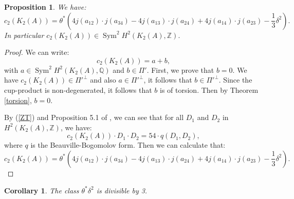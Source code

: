 \documentclass{amsart}
\DeclareMathOperator{\Sym}{Sym}
\newcommand{\Q}{\mathbb{Q}}
\newcommand{\Z}{\mathbb{Z}}
\theoremstyle{plain}
\newtheorem{proposition}[theorem]{Proposition}
\newtheorem{corollary}[theorem]{Corollary}
\theoremstyle{definition}
\theoremstyle{remark}
\begin{document}
\begin{proposition}
We have:
$$c_{2}(K_{2}(A))=\theta^{*}\left(4j(a_{12})\cdot j(a_{34})-4j(a_{13})\cdot j(a_{24})+4j(a_{14})\cdot j(a_{23})-\frac{1}{3}\delta^{2}\right).$$
In particular $c_{2}(K_{2}(A))\in \Sym^2 H^{2}(K_{2}(A),\Z).$
\end{proposition}
\begin{proof}
We can write:
$$c_{2}(K_{2}(A))=a+b,$$
with $a\in \Sym^2 H^{2}(K_{2}(A),\Q)$ and $b\in \Pi'$.
First, we prove that $b=0$.
We have $c_{2}(K_{2}(A))\in \Pi'^{\bot}$ and also $a\in \Pi'^{\bot}$, it follows that 
$b\in \Pi'^{\bot}$. 
Since the cup-product is non-degenerated, it follows that $b$ is of torsion. 
Then by Theorem \ref{torsion}, $b=0$.

By (\ref{ZT}) and Proposition 5.1 of \cite{HassettTschinkel}, we can see that for all $D_{1}$ and $D_{2}$ in $H^{2}(K_{2}(A),\Z)$, we have:
$$c_{2}(K_{2}(A))\cdot D_{1}\cdot D_{2}=54\cdot q(D_{1},D_{2}),$$
where $q$ is the Beauville-Bogomolov form.
Then we can calculate that:
$$c_{2}(K_{2}(A))=\theta^{*}\left(4j(a_{12})\cdot j(a_{34})-4j(a_{13})\cdot j(a_{24})+4j(a_{14})\cdot j(a_{23})-\frac{1}{3}\delta^{2}\right).$$
\end{proof}
\begin{corollary}\label{DeltaSquare3}
The class $\theta^* \delta^2$ is divisible by 3.
\end{corollary}
\end{document}
